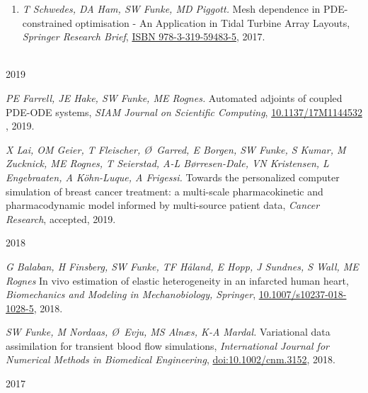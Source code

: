 \documentclass[11pt]{article}
\begin{document}
\newpage
{}
\begin{enumerate}
    \item \textit{T Schwedes, DA Ham, SW Funke,  MD Piggott.} Mesh dependence in PDE-constrained optimisation - An Application in Tidal Turbine Array Layouts, \textit{Springer Research Brief}, \href{https://www.springer.com/de/book/9783319594828}{ISBN 978-3-319-59483-5}, 2017.
\end{enumerate}

\\
2019
\begin{etaremune}
\setcounter{enumi}{19}
  \item \textit{PE Farrell, JE Hake, SW Funke, ME Rognes.} Automated adjoints of coupled PDE-ODE systems, \textit{SIAM Journal on Scientific Computing}, \href{https://doi.org/10.1137/17M1144532}{10.1137/17M1144532} , 2019.
  \item \textit{X Lai, OM Geier, T Fleischer, \O~Garred, E Borgen, SW Funke, S Kumar, M Zucknick, ME Rognes, T Seierstad, A-L B{\o}rresen-Dale, VN Kristensen, L Engebraaten, A K{\"o}hn-Luque, A Frigessi.} Towards the personalized computer simulation of breast cancer treatment: a multi-scale pharmacokinetic and pharmacodynamic model informed by multi-source patient data, \textit{Cancer Research}, accepted, 2019.
\end{etaremune}
2018
\begin{etaremune}
\setcounter{enumi}{18}
    \item \textit{G Balaban, H Finsberg, SW Funke, TF H\r{a}land, E Hopp, J Sundnes, S Wall, ME Rognes} In vivo estimation of elastic heterogeneity in an infarcted human heart, \textit{Biomechanics and Modeling in Mechanobiology, Springer}, \href{https://doi.org/10.1007/s10237-018-1028-5}{10.1007/s10237-018-1028-5}, 2018.
    \item \textit{SW Funke, M Nordaas, \O~Evju, MS Aln{\ae}s, K-A Mardal.} Variational data assimilation for transient blood flow simulations, \textit{International Journal for Numerical Methods in Biomedical Engineering}, \href{https://doi.org/10.1002/cnm.3152}{doi:10.1002/cnm.3152}, 2018.
\end{etaremune}
2017
\end{document}
